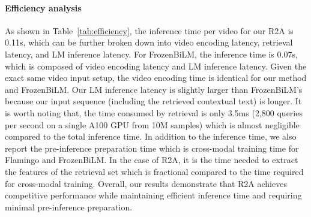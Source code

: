 \vspace{-3.5mm}

\paragraph{Efficiency analysis} As shown in Table~\ref{tab:efficiency}, the inference time per video for our R2A is 0.11s, which can be further broken down into video encoding latency, retrieval latency, and LM inference latency. For FrozenBiLM, the inference time is 0.07s, which is composed of video encoding latency and LM inference latency. Given the exact same video input setup, the video encoding time is identical for our method and FrozenBiLM. Our LM inference latency is slightly larger than FrozenBiLM's because our input sequence (including the retrieved contextual text) is longer. 
It is worth noting that, the time consumed by retrieval is only 3.5ms (2,800 queries per second on a single A100 GPU from 10M samples) which is almost negligible compared to the total inference time. In addition to the inference time, we also report the pre-inference preparation time which is cross-modal training time for Flamingo and FrozenBiLM. In the case of R2A, it is the time needed to extract the features of the retrieval set which is fractional compared to the time required for cross-modal training. Overall, our results demonstrate that R2A achieves competitive performance while maintaining efficient inference time and requiring minimal pre-inference preparation.



\begin{table}[t]
    \centering
    \vspace{-1mm}
    \caption{{\bf Efficiency comparison.} We compare efficiency with two previous methods. {\it Pre-inference} includes the cross-modal training cost for training based methods and retrieval set feature extraction cost for ours. We report efficiency using 10 retrieved sentences per video, at which {\it R2A} outperforms FrozenBiLM on all tasks.}
    \label{tab:efficiency}
\end{table}

